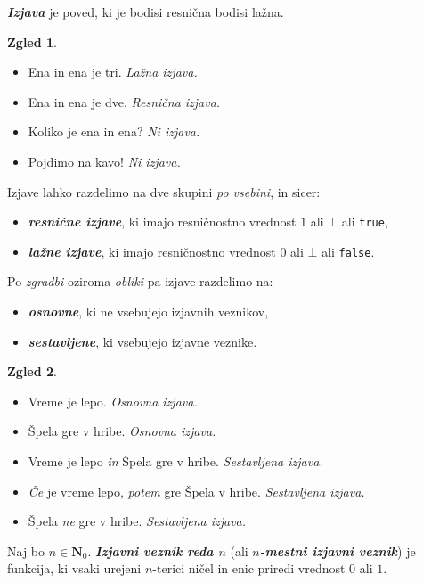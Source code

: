 \documentclass[11pt]{book}
\def\NN{\mathbf{N}}
\def\definicija{\color{rdeca}\bf\em}
\theoremstyle{definition}
\theoremstyle{zgled}
\newtheorem*{zgled}{Zgled}
\theoremstyle{odprtproblem}
\theoremstyle{domacanaloga}
\theoremstyle{izrek}
\begin{document}
{\definicija Izjava} je poved, ki je bodisi resnična bodisi lažna.

\begin{zgled} \leavevmode
\begin{itemize}
    \item Ena in ena je tri. \emph{Lažna izjava.}
    \item Ena in ena je dve. \emph{Resnična izjava.}
    \item Koliko je ena in ena? \emph{Ni izjava.}
    \item Pojdimo na kavo! \emph{Ni izjava.}
\end{itemize}
\end{zgled}

Izjave lahko razdelimo na dve skupini \emph{po vsebini}, in sicer:
\begin{itemize}
    \item {\definicija resnične izjave}, ki imajo resničnostno vrednost $1$ ali $\top$ ali \texttt{true},
    \item {\definicija lažne izjave}, ki imajo resničnostno vrednost $0$ ali $\bot$ ali \texttt{false}.
\end{itemize}
Po \emph{zgradbi} oziroma \emph{obliki} pa izjave razdelimo na:
\begin{itemize}
    \item {\definicija osnovne}, ki ne vsebujejo izjavnih veznikov,
    \item {\definicija sestavljene}, ki vsebujejo izjavne veznike.
\end{itemize}

\begin{zgled} \leavevmode
\begin{itemize}
    \item Vreme je lepo. \emph{Osnovna izjava.}
    \item Špela gre v hribe. \emph{Osnovna izjava.}
    \item Vreme je lepo \emph{in} Špela gre v hribe. \emph{Sestavljena izjava.}
    \item \emph{Če} je vreme lepo, \emph{potem} gre Špela v hribe. \emph{Sestavljena izjava.}
    \item Špela \emph{ne} gre v hribe. \emph{Sestavljena izjava.}
\end{itemize}
\end{zgled}

Naj bo $n \in \NN_0$. {\definicija Izjavni veznik reda $n$} (ali {\definicija $n$-mestni izjavni veznik}) je funkcija, ki vsaki urejeni $n$-terici ničel in enic priredi vrednost $0$ ali $1$.
\end{document}
